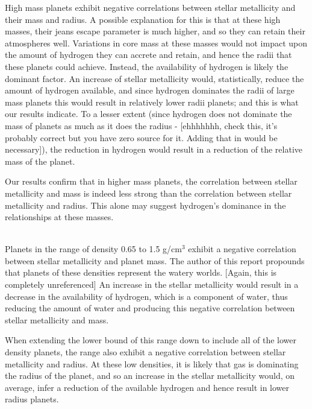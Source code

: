 \documentclass[a4paper,twocolumn,12pt]{article}
\begin{document}
High mass planets exhibit negative correlations between stellar metallicity and their mass and radius. A possible explanation for this is that at these high masses, their jeans escape parameter is much higher, and so they can retain their atmospheres well. Variations in core mass at these masses would not impact upon the amount of hydrogen they can accrete and retain, and hence the radii that these planets could achieve. Instead, the availability of hydrogen is likely the dominant factor. An increase of stellar metallicity would, statistically, reduce the amount of hydrogen available, and since hydrogen dominates the radii of large mass planets this would result in relatively lower radii planets; and this is what our results indicate. To a lesser extent (since hydrogen does not dominate the mass of planets as much as it does the radius - [ehhhhhhh, check this, it's probably correct but you have zero source for it. Adding that in would be necessary]), the reduction in hydrogen would result in a reduction of the relative mass of the planet.

Our results confirm that in higher mass planets, the correlation between stellar metallicity and mass is indeed less strong than the correlation between stellar metallicity and radius. This alone may suggest hydrogen's dominance in the relationships at these masses.


\\

Planets in the range of density 0.65 to 1.5 g/cm$^3$ exhibit a negative correlation between stellar metallicity and planet mass. The author of this report propounds that planets of these densities represent the watery worlds.
[Again, this is completely unreferenced]
An increase in the stellar metallicity would result in a decrease in the availability of hydrogen, which is a component of water, thus reducing the amount of water and producing this negative correlation between stellar metallicity and mass.

When extending the lower bound of this range down to include all of the lower density planets, the range also exhibit a negative correlation between stellar metallicity and radius. At these low densities, it is likely that gas is dominating the radius of the planet, and so an increase in the stellar metallicity would, on average, infer a reduction of the available hydrogen and hence result in lower radius planets.\\
\end{document}
